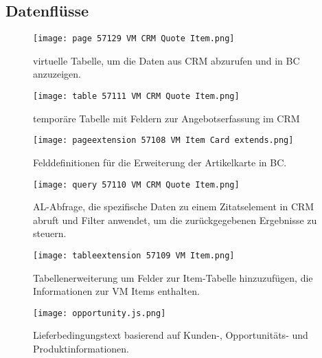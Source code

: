 \subsection{Datenflüsse}
\label{app:Datenfluesse}
\begin{figure}[htb]
    \centering
    \texttt{[image: page 57129 VM CRM Quote Item.png]}
    \caption{virtuelle Tabelle, um die Daten aus CRM abzurufen und in BC anzuzeigen.}
    \label{fig:page 57129 VM CRM Quote Item}
\end{figure}
\begin{figure}[htb]
    \centering
    \texttt{[image: table 57111 VM CRM Quote Item.png]}
    \caption{temporäre Tabelle mit Feldern zur Angebotserfassung im CRM}
    \label{fig:table 57111 VM CRM Quote Item}
\end{figure}
\begin{figure}[htb]
    \centering
    \texttt{[image: pageextension 57108 VM Item Card extends.png]}
    \caption{Felddefinitionen für die Erweiterung der Artikelkarte in BC.}
    \label{fig:pageextension 57108 VM Item Card extends}
\end{figure}
\begin{figure}[htb]
    \centering
    \texttt{[image: query 57110 VM CRM Quote Item.png]}
    \caption{AL-Abfrage, die spezifische Daten zu einem Zitatselement
    in CRM abruft und Filter anwendet, um die zurückgegebenen Ergebnisse zu steuern.}
    \label{fig:query 57110 VM CRM Quote Item}
\end{figure}
\begin{figure}[htb]
    \centering
    \texttt{[image: tableextension 57109 VM Item.png]}
    \caption{Tabellenerweiterung um Felder zur Item-Tabelle hinzuzufügen, die Informationen zur VM Items enthalten.}
    \label{fig:tableextension 57109 VM Item}
\end{figure}
\begin{figure}[htb]
    \centering
    \texttt{[image: opportunity.js.png]}
    \caption{Lieferbedingungstext basierend auf Kunden-, Opportunitäts- und Produktinformationen.}
    \label{fig:opportunity.js}
\end{figure}
\clearpage
